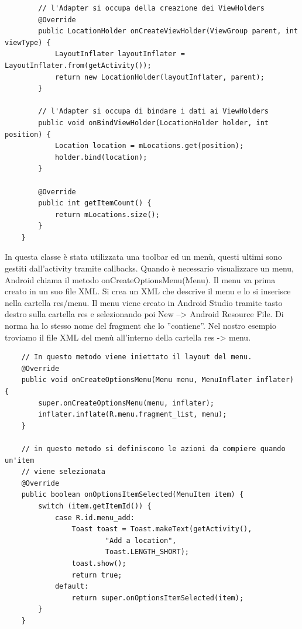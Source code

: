 \documentclass{article}
\begin{document}
\begin{itemize}
\begin{lstlisting}
        // l'Adapter si occupa della creazione dei ViewHolders
        @Override
        public LocationHolder onCreateViewHolder(ViewGroup parent, int viewType) {
            LayoutInflater layoutInflater = LayoutInflater.from(getActivity());
            return new LocationHolder(layoutInflater, parent);
        }

        // l'Adapter si occupa di bindare i dati ai ViewHolders
        public void onBindViewHolder(LocationHolder holder, int position) {
            Location location = mLocations.get(position);
            holder.bind(location);
        }

        @Override
        public int getItemCount() {
            return mLocations.size();
        }
    }
\end{lstlisting}
In questa classe è stata utilizzata una toolbar ed un menù, questi ultimi sono gestiti dall’activity tramite callbacks. Quando è
necessario visualizzare un menu, Android chiama il metodo onCreateOptionsMenu(Menu). Il menu va prima
creato in un suo file XML. Si crea un XML che descrive il menu e lo si inserisce nella cartella res/menu. 
Il menu viene creato in Android Studio tramite tasto destro sulla cartella res e selezionando poi New –>
Android Resource File. Di norma ha lo stesso nome del fragment che lo ”contiene”. Nel nostro esempio troviamo il file
XML del menù all'interno della cartella res -> menu.
\begin{lstlisting}
    // In questo metodo viene iniettato il layout del menu.
    @Override
    public void onCreateOptionsMenu(Menu menu, MenuInflater inflater) {
        super.onCreateOptionsMenu(menu, inflater);
        inflater.inflate(R.menu.fragment_list, menu);
    }

    // in questo metodo si definiscono le azioni da compiere quando un'item
    // viene selezionata
    @Override
    public boolean onOptionsItemSelected(MenuItem item) {
        switch (item.getItemId()) {
            case R.id.menu_add:
                Toast toast = Toast.makeText(getActivity(),
                        "Add a location",
                        Toast.LENGTH_SHORT);
                toast.show();
                return true;
            default:
                return super.onOptionsItemSelected(item);
        }
    }
\end{lstlisting}
\end{itemize}
\end{document}
